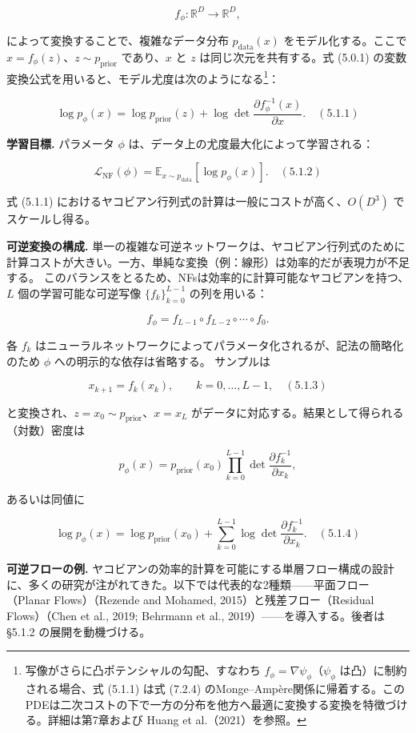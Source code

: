 \[
f_\phi: \mathbb{R}^D \to \mathbb{R}^D,
\]


によって変換することで、複雑なデータ分布 $p_{\mathrm{data}}(x)$ をモデル化する。ここで $x = f_\phi(z)$、$z \sim p_{\mathrm{prior}}$ であり、$x$ と $z$ は同じ次元を共有する。式 (5.0.1) の変数変換公式を用いると、モデル尤度は次のようになる\footnote{写像がさらに凸ポテンシャルの勾配、すなわち $f_\phi = \nabla\psi_\phi$（$\psi_\phi$ は凸）に制約される場合、式 (5.1.1) は式 (7.2.4) のMonge–Ampère関係に帰着する。このPDEは二次コストの下で一方の分布を他方へ最適に変換する変換を特徴づける。詳細は第7章および Huang et al.（2021）を参照。}：

\[
\log p_\phi(x) = \log p_{\mathrm{prior}}(z) + \log \det \frac{\partial f_\phi^{-1}(x)}{\partial x}. \quad (5.1.1)
\]


\textbf{学習目標.} パラメータ $\phi$ は、データ上の尤度最大化によって学習される：

\[
\mathcal{L}_{\mathrm{NF}}(\phi) = \mathbb{E}_{x\sim p_{\mathrm{data}}}[\log p_\phi(x)]. \quad (5.1.2)
\]


式 (5.1.1) におけるヤコビアン行列式の計算は一般にコストが高く、$O(D^3)$ でスケールし得る。

\textbf{可逆変換の構成.} 単一の複雑な可逆ネットワークは、ヤコビアン行列式のために計算コストが大きい。一方、単純な変換（例：線形）は効率的だが表現力が不足する。
このバランスをとるため、NFsは効率的に計算可能なヤコビアンを持つ、$L$ 個の学習可能な可逆写像 $\{f_k\}_{k=0}^{L-1}$ の列を用いる：

\[
f_\phi = f_{L-1} \circ f_{L-2} \circ \cdots \circ f_0.
\]


各 $f_k$ はニューラルネットワークによってパラメータ化されるが、記法の簡略化のため $\phi$ への明示的な依存は省略する。
サンプルは

\[
x_{k+1} = f_k(x_k), \qquad k = 0, \ldots, L-1, \quad (5.1.3)
\]


と変換され、$z = x_0 \sim p_{\mathrm{prior}}$、$x = x_L$ がデータに対応する。結果として得られる（対数）密度は

\[
p_\phi(x) = p_{\mathrm{prior}}(x_0) \prod_{k=0}^{L-1} \det \frac{\partial f_k^{-1}}{\partial x_k},
\]


あるいは同値に

\[
\log p_\phi(x) = \log p_{\mathrm{prior}}(x_0) + \sum_{k=0}^{L-1} \log \det \frac{\partial f_k^{-1}}{\partial x_k}. \quad (5.1.4)
\]


\textbf{可逆フローの例.} ヤコビアンの効率的計算を可能にする単層フロー構成の設計に、多くの研究が注がれてきた。以下では代表的な2種類——平面フロー（Planar Flows）（Rezende and Mohamed, 2015）と残差フロー（Residual Flows）（Chen et al., 2019; Behrmann et al., 2019）——を導入する。後者は §5.1.2 の展開を動機づける。

